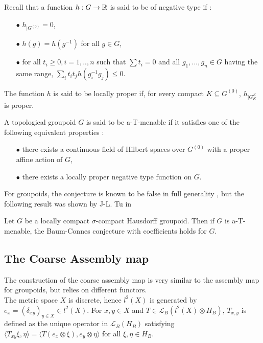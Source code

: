 Recall that a function $h : G\rightarrow \mathbb R$ is said to be of negative type if :
\begin{itemize}
\item[$\bullet$] $h_{|G^{(0)}}=0$,
\item[$\bullet$] $h(g)=h(g^{-1})$ for all $g\in G$,
\item[$\bullet$] for all $t_i\geq 0, i=1,..,n$ such that $\sum t_i=0$ and all $g_1,...,g_n\in G$ having the same range, $\sum_i t_i t_j h(g_i^{-1} g_j )\leq 0$.
\end{itemize}
The function $h$ is said to be locally proper if, for every compact $K \subseteq G^{(0)}$, $h_{|G_K^K}$ is proper.\\

\begin{definition}
A topological groupoid $G$ is said to be a-T-menable if it satisfies one of the following equivalent properties :
\begin{itemize}
\item[$\bullet$] there exists a continuous field of Hilbert spaces over $G^{(0)}$ with a proper affine action of $G$,
\item[$\bullet$] there exists a locally proper negative type function on $G$.
\end{itemize} 
\end{definition}

For groupoids, the conjecture is known to be false in full generality \cite{HigsonLaffSk}, but the following result was shown by J-L. Tu in \cite{TuThese}
\begin{thm}\label{Tu}
Let $G$ be a locally compact $\sigma$-compact Hausdorff groupoid. Then if $G$ is a-T-menable, the Baum-Connes conjecture with coefficients holds for $G$.
\end{thm}

\subsection{The Coarse Assembly map}

The construction of the coarse assembly map is very similar to the assembly map for groupoids, but relies on different functors.\\

The metric space $X$ is discrete, hence $l^2(X)$ is generated by $e_x = (\delta_{xy})_{y\in X}\in l^2(X)$. For $x,y\in X$ and $T\in \mathcal L_B(l^2(X)\otimes H_B)$, $T_{x,y}$ is defined as the unique operator in $\mathcal L_B(H_B)$ satisfying $\langle T_{xy}\xi,\eta\rangle = \langle T (e_x\otimes \xi),e_y\otimes \eta \rangle$ for all $\xi,\eta\in H_B$.\\

